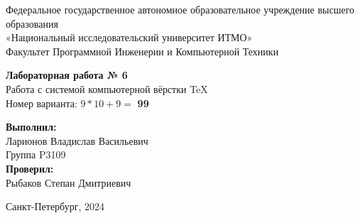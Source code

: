 \documentclass[a4paper,12pt]{article}
\begin{document}
\thispagestyle{empty}

\begin{center}
    Федеральное государственное автономное образовательное учреждение высшего образования \\[0.5em]
    «Национальный исследовательский университет ИТМО» \\

    \vspace{3em}
    Факультет Программной Инженерии и Компьютерной Техники \\
\end{center}

\vfill
\begin{center}
    {\Large \textbf{Лабораторная работа № 6}} \\[1em]
    {Работа с системой компьютерной вёрстки \TeX} \\[1em]
    Номер варианта: $9*10 + 9 =$ \textbf{99} \\
\end{center}


\vfill
\begin{flushright}
    \textbf{Выполнил:} \\[0.5em]
    Ларионов Владислав Васильевич \\[0.5em]
    Группа P3109 \\[2em]
    \textbf{Проверил:} \\[0.5em]
    Рыбаков Степан Дмитриевич \\
\end{flushright}

\vfill
\begin{center}
Санкт-Петербург, 2024
\end{center}
\end{document}
